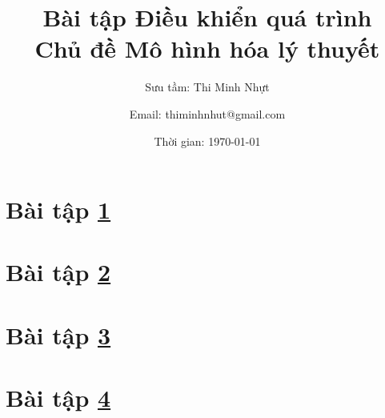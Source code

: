 \documentclass[11pt,a4paper]{article}
\title{\textbf{Bài tập Điều khiển quá trình \bigskip \\ Chủ đề Mô hình hóa lý thuyết}}
\author{Sưu tầm: Thi Minh Nhựt \and Email: thiminhnhut@gmail.com}
\date{Thời gian: \today}
\begin{document}
\maketitle

\section{Bài tập \ref{sec:baitap1-1binhchua}} \label{sec:baitap1-1binhchua}
    

\section{Bài tập \ref{sec:baitap2-1binhchua}} \label{sec:baitap2-1binhchua}
    

\section{Bài tập \ref{sec:baitap3-2binhchua}} \label{sec:baitap3-2binhchua}
    

\section{Bài tập \ref{sec:baitap4-2binhchua}} \label{sec:baitap4-2binhchua}
    
\end{document}

